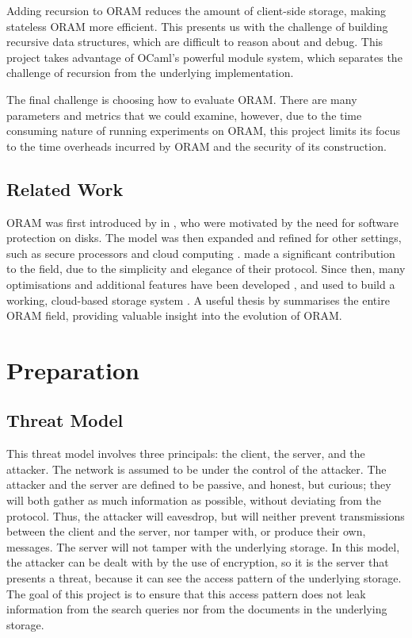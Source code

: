 \documentclass[12pt,a4paper,twoside,openright]{report}
\begin{document}
Adding recursion to ORAM reduces the amount of client-side storage, making stateless ORAM more efficient. This presents us with the challenge of building recursive data structures, which are difficult to reason about and debug. This project takes advantage of OCaml's powerful module system, which separates the challenge of recursion from the underlying implementation.

The final challenge is choosing how to evaluate ORAM. There are many parameters and metrics that we could examine, however, due to the time consuming nature of running experiments on ORAM, this project limits its focus to the time overheads incurred by ORAM and the security of its construction.

\section{Related Work}

ORAM was first introduced by \citet{goldreich1996software} in \citeyear{goldreich1996software}, who were motivated by the need for software protection on disks. The model was then expanded and refined for other settings, such as secure processors and cloud computing \cite{shi2011oblivious}. \citet{stefanov2013path} made a significant contribution to the field, due to the simplicity and elegance of their protocol. Since then, many optimisations and additional features have been developed \cite{yu2014enhancing,ren2015constants,moataz2015resizable}, and used to build a working, cloud-based storage system \cite{stefanov2013oblivistore}. A useful thesis by \citet{teeuwen2015evolution} summarises the entire ORAM field, providing valuable insight into the evolution of ORAM.

\chapter{Preparation}

\section{Threat Model}
\label{sec:threatmodel}

This threat model involves three principals: the client, the server, and the attacker. The network is assumed to be under the control of the attacker. The attacker and the server are defined to be passive, and honest, but curious; they will both gather as much information as possible, without deviating from the protocol. Thus, the attacker will eavesdrop, but will neither prevent transmissions between the client and the server, nor tamper with, or produce their own, messages. The server will not tamper with the underlying storage. In this model, the attacker can be dealt with by the use of encryption, so it is the server that presents a threat, because it can see the access pattern of the underlying storage. The goal of this project is to ensure that this access pattern does not leak information from the search queries nor from the documents in the underlying storage.
\end{document}
